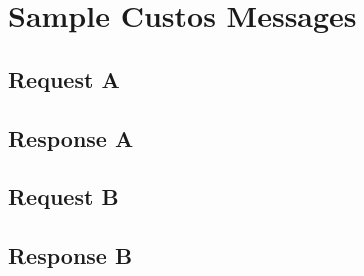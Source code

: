 \chapter{Sample Custos Messages}
\label{appx:messages}

\section{Request A}

\section{Response A}

\section{Request B}

\section{Response B}
